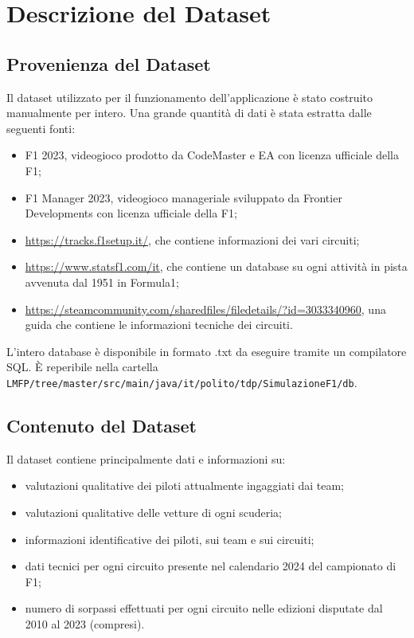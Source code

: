 \chapter{Descrizione del Dataset}

\label{Capitolo 3}

\section{Provenienza del Dataset}

Il dataset utilizzato per il funzionamento dell'applicazione è stato costruito manualmente per intero. Una grande quantità di dati è stata estratta dalle seguenti fonti:
\begin{itemize}
    \item F1 2023, videogioco prodotto da CodeMaster e EA con licenza ufficiale della F1;
    \item F1 Manager 2023, videogioco manageriale sviluppato da Frontier Developments con licenza ufficiale della F1;
    \item \url{https://tracks.f1setup.it/}, che contiene informazioni dei vari circuiti;
    \item \url{https://www.statsf1.com/it}, che contiene un database su ogni attività in pista avvenuta dal 1951 in Formula1;
    \item \url{https://steamcommunity.com/sharedfiles/filedetails/?id=3033340960}, una guida che contiene le informazioni tecniche dei circuiti.
\end{itemize}
L’intero database è disponibile in formato .txt da eseguire tramite un compilatore SQL. È reperibile nella cartella \texttt{LMFP/tree/master/src/main/java/it/polito/tdp/SimulazioneF1/db}.

\section{Contenuto del Dataset}

Il dataset contiene principalmente dati e informazioni su:
\begin{itemize}
    \item valutazioni qualitative dei piloti attualmente ingaggiati dai team;
    \item valutazioni qualitative delle vetture di ogni scuderia;
    \item informazioni identificative dei piloti, sui team e sui circuiti;
    \item dati tecnici per ogni circuito presente nel calendario 2024 del campionato di F1;
    \item numero di sorpassi effettuati per ogni circuito nelle edizioni disputate dal 2010 al 2023 (compresi).
\end{itemize}

